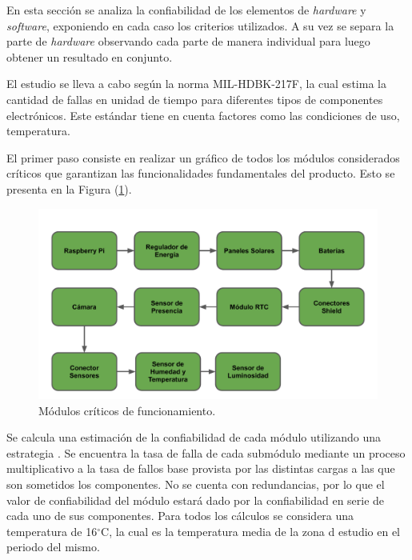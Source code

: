 %

%
En esta sección se analiza la confiabilidad de los elementos de \textit{hardware} y \textit{software}, exponiendo en cada caso los criterios utilizados. A su vez se separa la parte de \textit{hardware} observando cada parte de manera individual para luego obtener un resultado en conjunto.

El estudio se lleva a cabo según la norma MIL-HDBK-217F, la cual estima la cantidad de fallas en unidad de tiempo para diferentes tipos de componentes electrónicos. Este estándar tiene en cuenta factores como las condiciones de uso, temperatura.

El primer paso consiste en realizar un gráfico de todos los módulos considerados críticos que garantizan las funcionalidades fundamentales del producto. Esto se presenta en la Figura (\ref{fig:criticos}).
\begin{figure}[H]
	\centering
	\includegraphics[width=0.9\linewidth,page=1]{ImagenesEstudios/ModulosCriticos}		
	\caption{Módulos críticos de funcionamiento.}
	\label{fig:criticos}
\end{figure}
Se calcula una estimación de la confiabilidad de cada módulo utilizando una estrategia . Se encuentra la tasa de falla de cada submódulo mediante un proceso multiplicativo a la tasa de fallos base provista por las distintas cargas a las que son sometidos los componentes.
No se cuenta con redundancias, por lo que el valor de confiabilidad del módulo estará dado por la confiabilidad en serie de cada uno de sus componentes. Para todos los cálculos se considera una temperatura de 16$^{\circ}$C, la cual es la temperatura media de la zona d estudio en el periodo del mismo.
